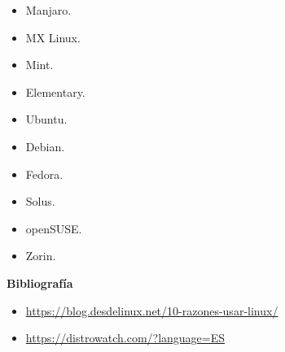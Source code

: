 \documentclass[11pt, a4paper]{report}
\begin{document}
\begin{itemize}
\item Manjaro.
\item MX Linux.
\item Mint.
\item Elementary.
\item Ubuntu.
\item Debian.
\item Fedora.
\item Solus.
\item openSUSE.
\item Zorin. 
\end{itemize}


\newpage

\textbf{Bibliografía} \\

\begin{itemize}

\item  \url{https://blog.desdelinux.net/10-razones-usar-linux/}
\item  \url{https://distrowatch.com/?language=ES}  
\end{itemize}
\end{document}
